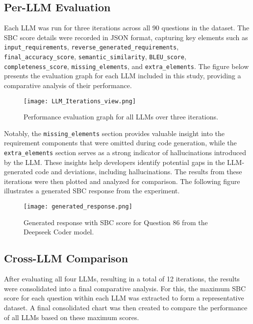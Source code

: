 \documentclass{article}
\begin{document}
\subsection{Per-LLM Evaluation}  
Each LLM was run for three iterations across all 90 questions in the dataset. The SBC score details were recorded in JSON format, capturing key elements such as \texttt{input\_requirements}, \texttt{reverse\_generated\_requirements}, \texttt{final\_accuracy\_score}, \texttt{semantic\_similarity}, \texttt{BLEU\_score}, \texttt{completeness\_score}, \texttt{missing\_elements}, and \texttt{extra\_elements}.  The figure below presents the evaluation graph for each LLM included in this study, providing a comparative analysis of their performance.

\vspace{-10pt}
\begin{figure}[H]
    \centering
    \texttt{[image: LLM\_Iterations\_view.png]}
    \caption{Performance evaluation graph for all LLMs over three iterations.}
    \label{fig:sample2}
\end{figure}

Notably, the \texttt{missing\_elements} section provides valuable insight into the requirement components that were omitted during code generation, while the \texttt{extra\_elements} section serves as a strong indicator of hallucinations introduced by the LLM. These insights help developers identify potential gaps in the LLM-generated code and deviations, including hallucinations. The results from these iterations were then plotted and analyzed for comparison.  The following figure illustrates a generated SBC response from the experiment.

\vspace{-10pt}
\begin{figure}[H]
    \centering
    \texttt{[image: generated\_response.png]}
    \caption{Generated response with SBC score for Question 86 from the Deepseek Coder model.}
    \label{fig:sample3}
\end{figure}

\subsection{Cross-LLM Comparison}  
After evaluating all four LLMs, resulting in a total of 12 iterations, the results were consolidated into a final comparative analysis. For this, the maximum SBC score for each question within each LLM was extracted to form a representative dataset. A final consolidated chart was then created to compare the performance of all LLMs based on these maximum scores.  
\end{document}
